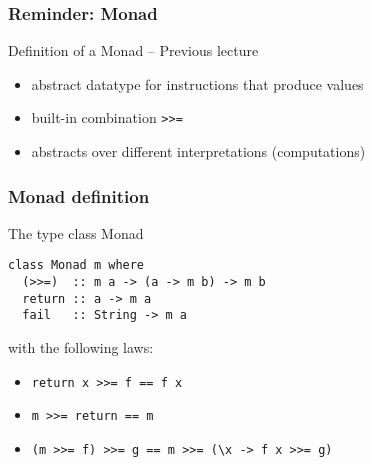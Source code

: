 \documentclass[pdftex,aspectratio=169]{beamer}
\author[Gabriel Radanne]{Dr. Gabriel Radanne \and Peter Thiemann}
\subtitle
{Monad Transformers}
\begin{document}
\begin{frame}
  \titlepage
\end{frame}

\begin{frame}
  \frametitle{Reminder: Monad}
  \begin{block}{Definition of a Monad -- Previous lecture}
    \begin{itemize}
    \item abstract datatype for instructions that produce values
    \item built-in combination \lstinline{>>=}
    \item abstracts over different interpretations (computations)
    \end{itemize}
  \end{block}
\end{frame}

\begin{frame}[fragile]
  \frametitle{Monad definition}
  \begin{block}{The type class Monad}
\begin{lstlisting}
class Monad m where
  (>>=)  :: m a -> (a -> m b) -> m b
  return :: a -> m a
  fail   :: String -> m a
\end{lstlisting}

with the following laws:
\begin{itemize}
\item \lstinline{return x >>= f == f x}
\item \lstinline{m >>= return == m}
\item \lstinline{(m >>= f) >>= g == m >>= (\x -> f x >>= g)}
\end{itemize}

\end{block}
\end{frame}
\end{document}
